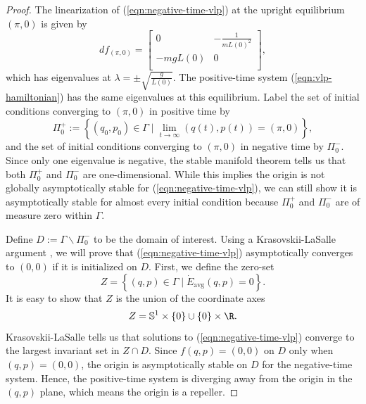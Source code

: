 \begin{proof}
   The linearization of (\ref{eqn:negative-time-vlp}) at the upright equilibrium
   \((\pi, 0)\) is given by
   \[
      df_{(\pi,0)} = \begin{bmatrix}
         0 & -\frac{1}{mL(0)^2} \\
         -m g L(0) & 0 \\
      \end{bmatrix}
      ,
   \]
   which has eigenvalues at \(\lambda = \pm \sqrt{\frac{g}{L(0)}}\).
   The positive-time system (\ref{eqn:vlp-hamiltonian}) has the same eigenvalues
   at this equilibrium.
   Label the set of initial conditions converging to \((\pi, 0)\) in
   positive time by
   \[
      \Pi_0^+ := \left\{ (q_0,p_0) \in \Gamma \mid \lim_{t \to \infty} (q(t),p(t)) = (\pi, 0) \right\}
      ,
   \]
   and the set of initial conditions converging to \((\pi,0)\)
   in negative time by \(\Pi_0^-\).
   Since only one eigenvalue is negative, the stable manifold theorem tells us
   that both \(\Pi_0^+\) and \(\Pi_0^-\) are one-dimensional.
   While this implies the origin is not globally asymptotically stable for
   (\ref{eqn:negative-time-vlp}), we can still show it is asymptotically stable
   for almost every initial condition because \(\Pi_0^+\) and \(\Pi_0^-\) are of
   measure zero within \(\Gamma\).

   Define \(D := \Gamma \backslash \Pi_0^-\) to be the domain of interest.
   Using a Krasovskii-LaSalle argument \cite{krasovskii_lasalle}, 
   we will prove that (\ref{eqn:negative-time-vlp}) asymptotically converges to
   \((0,0)\) if it is initialized on \(D\).
   First, we define the zero-set
   \[
      Z = \left\{(q,p) \in \Gamma \mid 
      \dot{E}_\text{avg}(q,p) = 0 \right\}
      .
   \]
   It is easy to show that \(Z\) is the union of the coordinate axes
   \[
      Z= \mathbb{S}^1 \times \left\{0\right\} \cup 
         \left\{0\right\} \times \R
      .
   \]
   Krasovskii-LaSalle tells us that solutions to (\ref{eqn:negative-time-vlp})
   converge to the largest invariant set in \(Z \cap D\).
   Since \(f(q,p) = (0,0)\) on \(D\) only when \((q,p) = (0,0)\),
   the origin is asymptotically stable on \(D\) for the negative-time system.
   Hence, the positive-time system is diverging away from the origin 
   in the \((q,p)\) plane, which means the origin is a repeller.


\end{proof}
